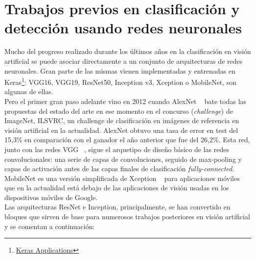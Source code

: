 \documentclass{bmvc2k}
\begin{document}
\section{Trabajos previos en clasificación y detección usando redes neuronales}
Mucho del progreso realizado durante los últimos años en la clasificación en visión artificial se puede asociar directamente a un conjunto de arquitecturas de redes neuronales. Gran parte de las mismas vienen implementadas y entrenadas en Keras\footnote {\href{https://keras.io/applications/}{Keras Applications}}: VGG16, VGG19, ResNet50, Inception v3, Xception o MobileNet, son algunas de ellas.\\ Pero el primer gran paso adelante vino en 2012 cuando AlexNet ~\cite{krizhevsky2012imagenet} bate todas las propuestas del estado del arte en ese momento en el concurso (\textit{challenge}) de ImageNet, ILSVRC, un challenge de clasificación en imágenes de referencia en visión artificial en la actualidad. AlexNet obtuvo una tasa de error en test del 15,3\% en comparación con el ganador el año anterior que fue del 26,2\%. Esta red, junto con las redes VGG ~\cite{simonyan2014very}, sigue el arquetipo de diseño básico de las redes convolucionales: una serie de capas de convoluciones, seguido de max-pooling y capas de activación antes de las capas finales de clasificación \textit{fully-connected}. MobileNet es una versión simplificada de Xception ~\cite{chollet2016xception} para aplicaciones móviles que en la actualidad está debajo de las aplicaciones de visión usadas en los dispositivos móviles de Google.\\
Las arquitecturas ResNet e Inception, principalmente, se han convertido en bloques que sirven de base para numerosos trabajos posteriores en visión artificial y se comentan a continuación:
\end{document}
